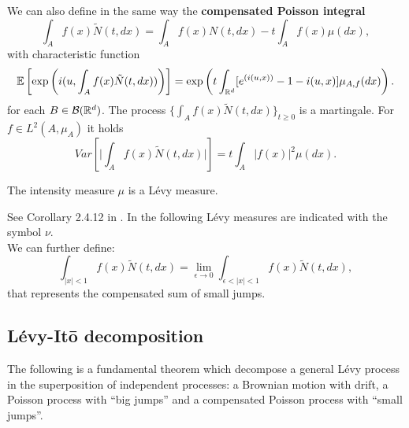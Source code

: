 \noindent
We can also define in the same way the \textbf{compensated Poisson integral}
\begin{equation}
  \int_A f(x) \tilde{N}(t,dx) = \int_A f(x) N(t,dx) - t \int_A f(x) \mu(dx), 
\end{equation}
with characteristic function
\begin{equation}
  \mathbb{E} \left[ \exp \left( i(u,\int_A f(x) \tilde{N}(t,dx)) \right) \right] = 
  \exp \left( t \int_{\mathbb{R}^d} [e^{(i(u,x))}-1-i(u,x)] \mu_{A,f}(dx) \right).
\end{equation}
for each $B \in \mathcal{B}(\mathbb{R}^d)$.
The process $\{\int_A f(x) \tilde N(t,dx)\}_{t \ge 0}$ is a martingale. For $f \in L^2(A,\mu_A)$ it holds
\begin{equation}
 Var \left[ \biggr|\int_A f(x) \tilde N(t,dx)\biggr|\right] = t \int_A |f(x)|^2 \mu(dx).
\end{equation}
 
\begin{Theorem}
 The intensity measure $\mu$ is a Lévy measure.
\end{Theorem}
 See Corollary 2.4.12 in \cite{Applebaum}. In the following Lévy measures are indicated with the symbol $\nu$.\\ 
We can further define:
\begin{equation}
\int_{|x|<1} f(x) \tilde N(t,dx) = \lim_{\epsilon \to 0} \int_{\epsilon < |x| < 1} f(x) \tilde N(t,dx), 
\end{equation}
that represents the compensated sum of small jumps.

 
\subsection{Lévy-It\={o} decomposition}

The following is a fundamental theorem which decompose a general Lévy process in the superposition 
of independent processes: a Brownian motion with drift, a Poisson process with ``big jumps'' and a compensated Poisson process with ``small jumps''.

